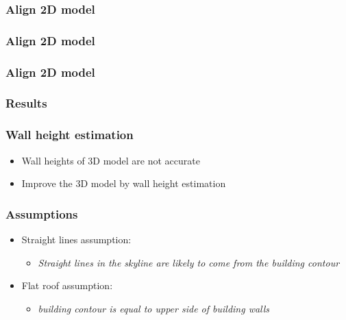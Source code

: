 \documentclass{beamer}
\begin{document}
\frame
{
	\frametitle{Align 2D model}
}


\frame
{
	\frametitle{Align 2D model}
}


\frame
{
	\frametitle{Align 2D model}
}

\frame
{
	\frametitle{Results}
}

\frame
{
	\frametitle{Wall height estimation}
	\begin{itemize}
	\item <+-| alert@+> Wall heights of 3D model are not accurate
	\item <+-| alert@+> Improve the 3D model by wall height estimation
	\end{itemize}
}

\frame
{
	\frametitle{Assumptions}
	\begin{itemize}
		\item <+-| alert@+> Straight lines assumption:
		\begin{itemize}
		\item <+-| alert@+> \emph{Straight lines in the skyline are likely to come from the
		building contour}
		\end{itemize}
		\item <+-| alert@+> Flat roof assumption:
		\begin{itemize}
		\item <+-| alert@+> \emph{building contour is equal to upper side of building walls}
		\end{itemize}
	\end{itemize}
}
\end{document}
